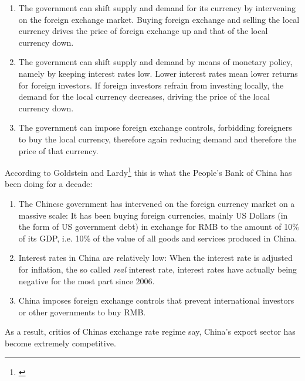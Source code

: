 \begin{enumerate}
\item{The government can shift supply and demand for its currency by intervening on the foreign exchange market. Buying foreign exchange and selling the local currency drives the price of foreign exchange up and that of the local currency down.}
\item{The government can shift supply and demand by means of monetary policy, namely by keeping interest rates low. Lower interest rates mean lower returns for foreign investors. If foreign investors refrain from investing locally, the demand for the local currency decreases, driving the price of the local currency down.}
\item{The government can impose foreign exchange controls, forbidding foreigners to buy the local currency, therefore again reducing demand and therefore the price of that currency.}
\end{enumerate}

According to Goldstein and Lardy\footnote{\cite[pp.  
40]{GoldsteinLardy2008}}  this is what the People's Bank of China has been doing for a decade:

\begin{enumerate}
\item{The Chinese government has intervened on the foreign currency 
		market on a massive scale: It has been buying foreign 
		currencies, mainly US Dollars (in the form of US government 
		debt) in exchange for RMB to the amount of 10\% of its GDP, i.e. 
		10\% of the value of all goods and services produced in China.} 
\item{Interest rates in China are relatively low: When the interest rate is adjusted for inflation, the so called \emph{real} interest rate, interest rates have actually being negative for the most part since 2006.} %
\item{China imposes foreign exchange controls that prevent international investors or other governments to buy RMB.}%
\end{enumerate}

As a result, critics of Chinas exchange rate regime say, China's export sector has become extremely competitive. 


